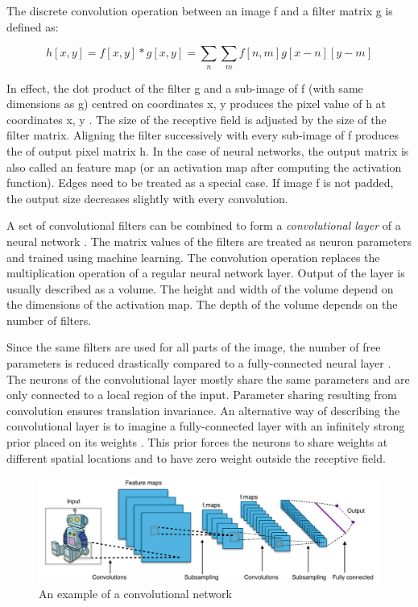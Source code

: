 The discrete convolution operation between an image f and a filter matrix g is defined as:

\begin{equation}
	h[x,y]=f[x,y]*g[x,y]=\sum_{n}\sum_{m} f[n,m]g[x-n][y-m]
\end{equation}

In effect, the dot product of the filter g and a sub-image of f (with same dimensions as g) centred on coordinates x, y produces the pixel value of h at coordinates x, y \cite{goodfellow2016deep}.  The size of the receptive field is adjusted by the size of the filter matrix. Aligning the filter successively with every sub-image of f produces the of output pixel matrix h. In the case of neural networks, the output matrix is also called an feature map \cite{goodfellow2016deep}(or an activation map after computing the activation function). Edges need to be treated as a special case. If image f is not padded, the output size decreases slightly with every convolution.

A set of convolutional filters can be combined to form a \textit{convolutional layer} of a neural network \cite{fukushima1988neocognitron}. The matrix values of the filters are treated as neuron parameters and trained using machine learning. The convolution operation replaces the multiplication operation of a regular neural network layer. Output of the layer is usually described as a volume. The height and width of the volume depend on the dimensions of the activation map. The depth of the volume depends on the number of filters.

Since the same filters are used for all parts of the image, the number of free parameters is reduced drastically compared to a fully-connected neural layer \cite{lecun1989backpropagation}.  The neurons of the convolutional layer mostly share the same parameters and are only connected to a local region of the input. Parameter sharing resulting from convolution ensures translation invariance. An alternative way of describing the convolutional layer is to imagine a fully-connected layer with an infinitely strong prior placed on its weights \cite{goodfellow2016deep}. This prior forces the neurons to share weights at different spatial locations and to have zero weight outside the receptive field.

\begin{figure}[h]
	\includegraphics[width=\textwidth]{Figures/Section3_Convnetwork.png} 
	\centering
	\captionsetup{justification=centering}
	\caption{An example of a convolutional network}
	\label{fig:Convnetwork}
\end{figure}

